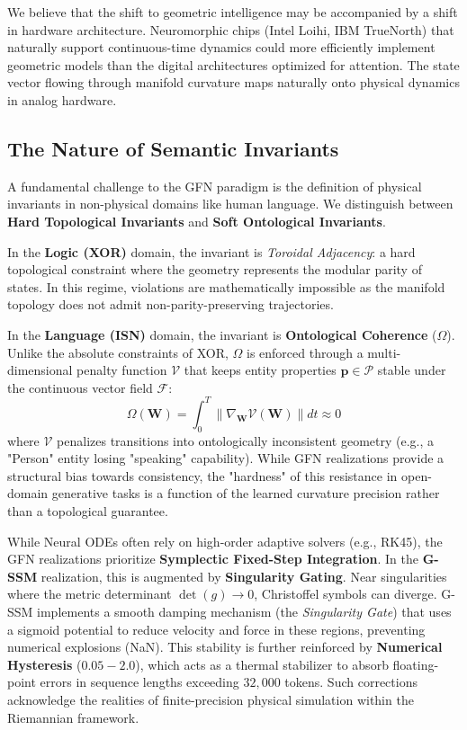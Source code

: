 \documentclass[12pt,a4paper]{article}
\begin{document}
We believe that the shift to geometric intelligence may be accompanied by a shift in hardware architecture. Neuromorphic chips (Intel Loihi, IBM TrueNorth) that naturally support continuous-time dynamics could more efficiently implement geometric models than the digital architectures optimized for attention. The state vector flowing through manifold curvature maps naturally onto physical dynamics in analog hardware.

\subsection{The Nature of Semantic Invariants}
\label{sec:semantic-invariants}

A fundamental challenge to the GFN paradigm is the definition of physical invariants in non-physical domains like human language. We distinguish between \textbf{Hard Topological Invariants} and \textbf{Soft Ontological Invariants}.

In the \textbf{Logic (XOR)} domain, the invariant is \textit{Toroidal Adjacency}: a hard topological constraint where the geometry represents the modular parity of states. In this regime, violations are mathematically impossible as the manifold topology does not admit non-parity-preserving trajectories.

In the \textbf{Language (ISN)} domain, the invariant is \textbf{Ontological Coherence} ($\Omega$). Unlike the absolute constraints of XOR, $\Omega$ is enforced through a multi-dimensional penalty function $\mathcal{V}$ that keeps entity properties $\mathbf{p} \in \mathcal{P}$ stable under the continuous vector field $\mathcal{F}$:
\begin{equation}
    \Omega(\mathbf{W}) = \int_{0}^{T} \|\nabla_{\mathbf{W}} \mathcal{V}(\mathbf{W})\| dt \approx 0
    \label{eq:ontological-coherence}
\end{equation}
where $\mathcal{V}$ penalizes transitions into ontologically inconsistent geometry (e.g., a "Person" entity losing "speaking" capability). While GFN realizations provide a structural bias towards consistency, the "hardness" of this resistance in open-domain generative tasks is a function of the learned curvature precision rather than a topological guarantee.

While Neural ODEs often rely on high-order adaptive solvers (e.g., RK45), the GFN realizations prioritize \textbf{Symplectic Fixed-Step Integration}. In the \textbf{G-SSM} realization, this is augmented by \textbf{Singularity Gating}. Near singularities where the metric determinant $\det(g) \to 0$, Christoffel symbols can diverge. G-SSM implements a smooth damping mechanism (the \textit{Singularity Gate}) that uses a sigmoid potential to reduce velocity and force in these regions, preventing numerical explosions (NaN). This stability is further reinforced by \textbf{Numerical Hysteresis} ($0.05 - 2.0$), which acts as a thermal stabilizer to absorb floating-point errors in sequence lengths exceeding $32,000$ tokens. Such corrections acknowledge the realities of finite-precision physical simulation within the Riemannian framework.
\end{document}
